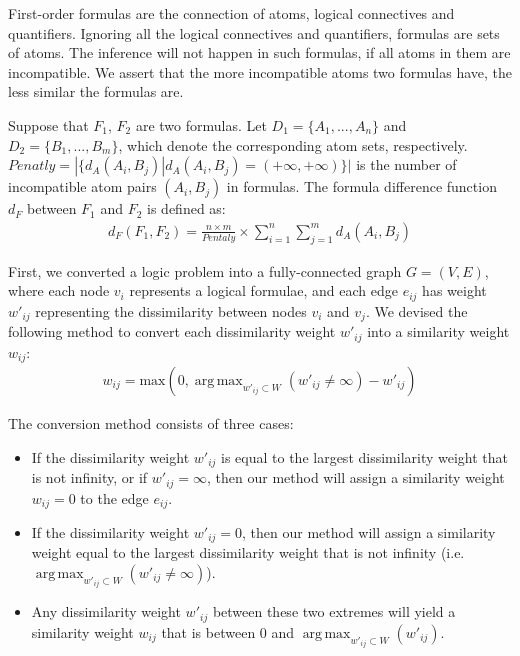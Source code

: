 \documentclass[EPiC]{easychair}
\DeclareMathOperator*{\argmaxA}{arg\,max} %
\begin{document}
First-order formulas are the connection of atoms, logical connectives and 
quantifiers. 
Ignoring all the logical connectives and quantifiers, formulas are sets of 
atoms. 
The inference will not happen in such formulas, if all atoms in them are 
incompatible. 
We assert that the more incompatible atoms two formulas have, the less 
similar the formulas are.

Suppose that $F_1$, $F_2$ are two formulas. 
Let $D_1=\{A_1, ..., A_n\}$ and $D_2=\{B_1, ..., B_m\}$, which denote the 
corresponding atom sets, respectively. 
$Penatly=|\{d_A(A_i,B_j) | d_A(A_i,B_j)=(+\infty, +\infty)\}|$ is the number 
of incompatible atom pairs $(A_i,B_j)$ in formulas. 
The formula difference function $d_F$ between $F_1$ and $F_2$ is defined as:
	\begin{align}
		d_F(F_1, F_2) = \frac{n\times m}{Pentaly}\times \sum_{i=1}^n \sum_{j=1}^{m}d_A(A_i, B_j)
	\end{align}

First, we converted a logic problem into a 
fully-connected graph $G = (V, E)$, where each node $v_{i}$ represents a 
logical formulae, and each edge $e_{ij}$ has weight $w'_{ij}$ representing 
the dissimilarity between nodes $v_{i}$ and $v_{j}$. We devised the following 
method to convert each dissimilarity weight $w'_{ij}$ into a similarity 
weight $w_{ij}$:
\begin{align}
w_{ij} = \textrm{max}(0, 
	\argmaxA_{w'_{ij} \subset W} (w'_{ij} \neq \infty) - w'_{ij})
\end{align}

The conversion method consists of three cases:
\begin{itemize}
\item If the dissimilarity weight $w'_{ij}$ is equal to the largest 
dissimilarity weight that is not infinity, or if $w'_{ij} = \infty$, then 
our method will assign a similarity weight $w_{ij} = 0$ to the edge $e_{ij}$.

\item If the dissimilarity weight $w'_{ij} = 0$, then our method will assign 
a similarity weight equal to the largest dissimilarity weight that is not 
infinity (i.e. $\argmaxA_{w'_{ij} \subset W} (w'_{ij} \neq \infty)$).

\item Any dissimilarity weight $w'_{ij}$ between these two extremes will 
yield a similarity weight $w_{ij}$ that is between 
$0$ and $\argmaxA_{w'_{ij} \subset W} (w'_{ij})$.
\end{itemize}
\end{document}
